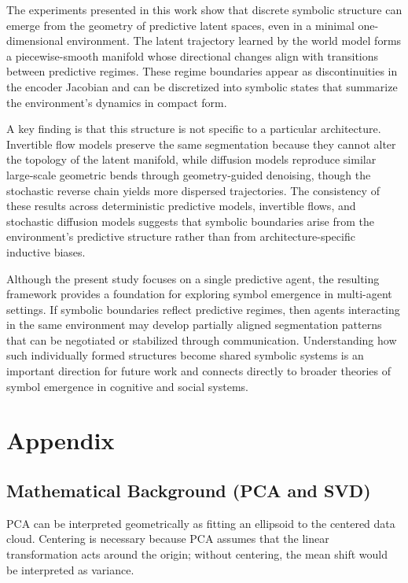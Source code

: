 \documentclass[11pt]{article}
\begin{document}
The experiments presented in this work show that discrete symbolic structure can emerge from the geometry of predictive latent spaces, even in a minimal one-dimensional environment. The latent trajectory learned by the world model forms a piecewise-smooth manifold whose directional changes align with transitions between predictive regimes. These regime boundaries appear as discontinuities in the encoder Jacobian and can be discretized into symbolic states that summarize the environment's dynamics in compact form.

A key finding is that this structure is not specific to a particular architecture. Invertible flow models preserve the same segmentation because they cannot alter the topology of the latent manifold, while diffusion models reproduce similar large‑scale geometric bends through geometry‑guided denoising, though the stochastic reverse chain yields more dispersed trajectories. The consistency of these results across deterministic predictive models, invertible flows, and stochastic diffusion models suggests that symbolic boundaries arise from the environment's predictive structure rather than from architecture-specific inductive biases.

Although the present study focuses on a single predictive agent, the resulting framework provides a foundation for exploring symbol emergence in multi-agent settings. If symbolic boundaries reflect predictive regimes, then agents interacting in the same environment may develop partially aligned segmentation patterns that can be negotiated or stabilized through communication. Understanding how such individually formed structures become shared symbolic systems is an important direction for future work and connects directly to broader theories of symbol emergence in cognitive and social systems.

\section{Appendix}

\subsection{Mathematical Background (PCA and SVD)}

PCA can be interpreted geometrically as fitting an ellipsoid to the centered data cloud. Centering is necessary because PCA assumes that the linear transformation acts around the origin; without centering, the mean shift would be interpreted as variance.
\end{document}
